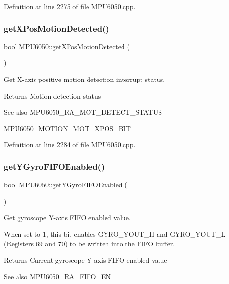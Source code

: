 Definition at line 2275 of file M\+P\+U6050.\+cpp.

\mbox{\label{classMPU6050_a410af58f5ff5f74e4ef8d61495908226}} 
\subsubsection{\texorpdfstring{getXPosMotionDetected()}{getXPosMotionDetected()}}
{\footnotesize\ttfamily bool M\+P\+U6050\+::get\+X\+Pos\+Motion\+Detected (\begin{DoxyParamCaption}{ }\end{DoxyParamCaption})}



Get X-\/axis positive motion detection interrupt status. 

\begin{DoxyReturn}{Returns}
Motion detection status 
\end{DoxyReturn}
\begin{DoxySeeAlso}{See also}
M\+P\+U6050\+\_\+\+R\+A\+\_\+\+M\+O\+T\+\_\+\+D\+E\+T\+E\+C\+T\+\_\+\+S\+T\+A\+T\+US 

M\+P\+U6050\+\_\+\+M\+O\+T\+I\+O\+N\+\_\+\+M\+O\+T\+\_\+\+X\+P\+O\+S\+\_\+\+B\+IT 
\end{DoxySeeAlso}


Definition at line 2284 of file M\+P\+U6050.\+cpp.

\mbox{\label{classMPU6050_a86c85d5b5c93df82394435b868e17463}} 
\subsubsection{\texorpdfstring{getYGyroFIFOEnabled()}{getYGyroFIFOEnabled()}}
{\footnotesize\ttfamily bool M\+P\+U6050\+::get\+Y\+Gyro\+F\+I\+F\+O\+Enabled (\begin{DoxyParamCaption}{ }\end{DoxyParamCaption})}



Get gyroscope Y-\/axis F\+I\+FO enabled value. 

When set to 1, this bit enables G\+Y\+R\+O\+\_\+\+Y\+O\+U\+T\+\_\+H and G\+Y\+R\+O\+\_\+\+Y\+O\+U\+T\+\_\+L (Registers 69 and 70) to be written into the F\+I\+FO buffer. \begin{DoxyReturn}{Returns}
Current gyroscope Y-\/axis F\+I\+FO enabled value 
\end{DoxyReturn}
\begin{DoxySeeAlso}{See also}
M\+P\+U6050\+\_\+\+R\+A\+\_\+\+F\+I\+F\+O\+\_\+\+EN 
\end{DoxySeeAlso}


